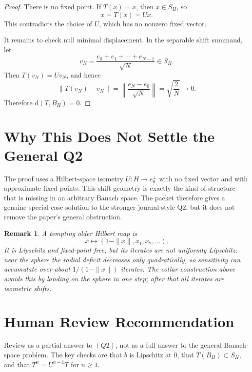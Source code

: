 \documentclass[11pt]{article}
\newtheorem{remark}{Remark}
\begin{document}
\begin{proof}
There is no fixed point.  If \(T(x)=x\), then \(x\in S_H\), so
\[
x=T(x)=Ux .
\]
This contradicts the choice of \(U\), which has no nonzero fixed vector.

It remains to check null minimal displacement.  In the separable shift
summand, let
\[
v_N=\frac{e_0+e_1+\cdots+e_{N-1}}{\sqrt N}\in S_H .
\]
Then \(T(v_N)=Uv_N\), and hence
\[
\|T(v_N)-v_N\|
=\left\|\frac{e_N-e_0}{\sqrt N}\right\|
=\sqrt{\frac{2}{N}}\longrightarrow 0 .
\]
Therefore \(\mathrm d(T,B_H)=0\).
\end{proof}

\section*{Why This Does Not Settle the General Q2}

The proof uses a Hilbert-space isometry \(U:H\to e_0^\perp\) with no fixed
vector and with approximate fixed points.  This shift geometry is exactly the
kind of structure that is missing in an arbitrary Banach space.  The packet
therefore gives a genuine special-case solution to the stronger journal-style
Q2, but it does not remove the paper's general obstruction.

\begin{remark}
A tempting older Hilbert map is
\[
x\mapsto (1-\|x\|,x_1,x_2,\ldots).
\]
It is Lipschitz and fixed-point free, but its iterates are not uniformly
Lipschitz: near the sphere the radial deficit decreases only quadratically,
so sensitivity can accumulate over about \(1/(1-\|x\|)\) iterates.  The collar
construction above avoids this by landing on the sphere in one step; after
that all iterates are isometric shifts.
\end{remark}

\section*{Human Review Recommendation}

Review as a partial answer to \((Q2)\), not as a full answer to the general
Banach-space problem.  The key checks are that \(b\) is Lipschitz at \(0\),
that \(T(B_H)\subset S_H\), and that \(T^n=U^{n-1}T\) for \(n\ge 1\).
\end{document}
